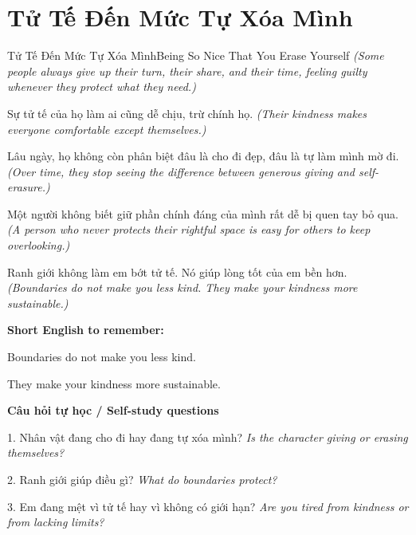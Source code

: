 \section{Tử Tế Đến Mức Tự Xóa Mình}
\begin{truyen}{Tử Tế Đến Mức Tự Xóa Mình}{Being So Nice That You Erase Yourself}
\textit{(Some people always give up their turn, their share, and their time, feeling guilty whenever they protect what they need.)}

Sự tử tế của họ làm ai cũng dễ chịu, trừ chính họ.
\textit{(Their kindness makes everyone comfortable except themselves.)}

Lâu ngày, họ không còn phân biệt đâu là cho đi đẹp, đâu là tự làm mình mờ đi.
\textit{(Over time, they stop seeing the difference between generous giving and self-erasure.)}

Một người không biết giữ phần chính đáng của mình rất dễ bị quen tay bỏ qua.
\textit{(A person who never protects their rightful space is easy for others to keep overlooking.)}

\end{truyen}

\begin{baihoc}
Ranh giới không làm em bớt tử tế. Nó giúp lòng tốt của em bền hơn.
\textit{(Boundaries do not make you less kind. They make your kindness more sustainable.)}
\end{baihoc}

\begin{ghinhoanh}
\textbf{Short English to remember:}

Boundaries do not make you less kind.

They make your kindness more sustainable.

\end{ghinhoanh}

\begin{tuhocnhanh}
\textbf{Câu hỏi tự học / Self-study questions}

1. Nhân vật đang cho đi hay đang tự xóa mình? \textit{Is the character giving or erasing themselves?}

2. Ranh giới giúp điều gì? \textit{What do boundaries protect?}

3. Em đang mệt vì tử tế hay vì không có giới hạn? \textit{Are you tired from kindness or from lacking limits?}
\end{tuhocnhanh}
\ngancach


